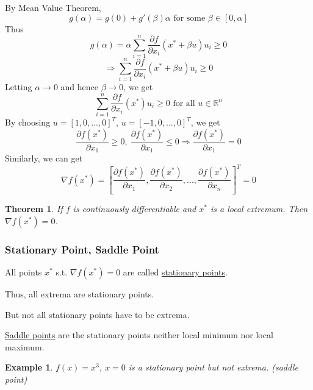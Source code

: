 \documentclass[11pt,a4paper]{article}
\newtheorem{theorem}{Theorem}
\newtheorem{example}{Example}
\begin{document}
By Mean Value Theorem, $$g(\alpha)=g(0)+g'(\beta)\alpha\text{ for some }\beta\in[0,\alpha]$$
Thus $$g(\alpha)=\alpha\sum_{i=1}^n \frac{\partial f}{\partial x_i}(x^*+\beta u)u_i\geq 0$$
$$\Rightarrow \sum_{i=1}^n \frac{\partial f}{\partial x_i}(x^*+\beta u)u_i\geq 0$$
Letting $\alpha \rightarrow	0$ and hence $\beta \rightarrow	0$, we get $$\sum_{i=1}^n \frac{\partial f}{\partial x_i}(x^*)u_i\geq 0\text{ for all }u\in \mathbb{R}^n$$
By choosing $u=[1,0,...,0]^T$, $u=[-1,0,...,0]^T$, we get $$\frac{\partial f(x^*)}{\partial x_1}\geq 0,\ \frac{\partial f(x^*)}{\partial x_1}\leq 0 \Rightarrow	\frac{\partial f(x^*)}{\partial x_1}= 0$$
Similarly, we can get $$\nabla f(x^*)=[\frac{\partial f(x^*)}{\partial x_1},\frac{\partial f(x^*)}{\partial x_2},...,\frac{\partial f(x^*)}{\partial x_n}]^T=0$$

\begin{theorem}
If $f$ is continuously differentiable and $x^*$ is a local extremum. Then $\nabla f(x^*)=0$.
\end{theorem}

\subsubsection{Stationary Point, Saddle Point}
All points $x^*$ s.t. $\nabla f(x^*)=0$ are called \underline{stationary points}.

Thus, all extrema are stationary points.

But not all stationary points have to be extrema.

\underline{Saddle points} are the stationary points neither local minimum nor local maximum.

\begin{example}
$f(x)=x^3$, $x=0$ is a stationary point but not extrema. (saddle point)
\end{example}
\end{document}
